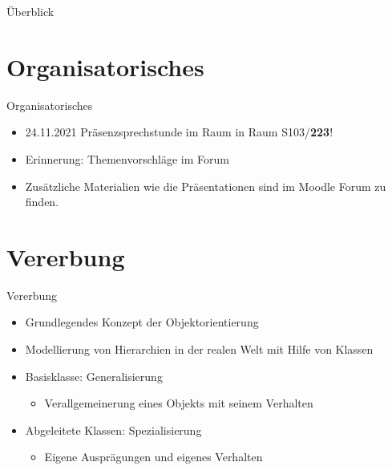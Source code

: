 \documentclass{../tuda-beamer}
\date{17. November 2021}
\begin{document}
  \maketitle

  \begin{frame}{Überblick}
    \tableofcontents
  \end{frame}


  \section{Organisatorisches}
  \begin{frame}{Organisatorisches}
    \begin{itemize}
      \item 24.11.2021 Präsenzsprechstunde im Raum in Raum S103/\textbf{223}!
      \item Erinnerung: Themenvorschläge im Forum
      \item Zusätzliche Materialien wie die Präsentationen sind im Moodle Forum zu finden.
    \end{itemize}
  \end{frame}


  \section{Vererbung}
  \begin{frame}{Vererbung}
    \begin{itemize}
      \item Grundlegendes Konzept der Objektorientierung
      \item Modellierung von Hierarchien in der realen Welt mit Hilfe von Klassen
      \item Basisklasse: Generalisierung
      \begin{itemize}
        \item Verallgemeinerung eines Objekts mit seinem Verhalten
      \end{itemize}
      \item Abgeleitete Klassen: Spezialisierung
      \begin{itemize}
        \item Eigene Ausprägungen und eigenes Verhalten
      \end{itemize}
    \end{itemize}
  \end{frame}
\end{document}
